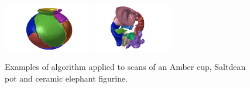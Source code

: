 \documentclass[acmlarge,screen,dvipsnames]{acmart}
\begin{document}
\begin{figure}[h]
  \includegraphics[width=0.33\textwidth]{images/saltdeanpuzzle4}%
  \includegraphics[width=0.33\textwidth]{images/elephantpuzzle4}
  \caption{Examples of algorithm applied to scans of an Amber cup, Saltdean pot and
    ceramic elephant figurine.}
\end{figure}
\end{document}
